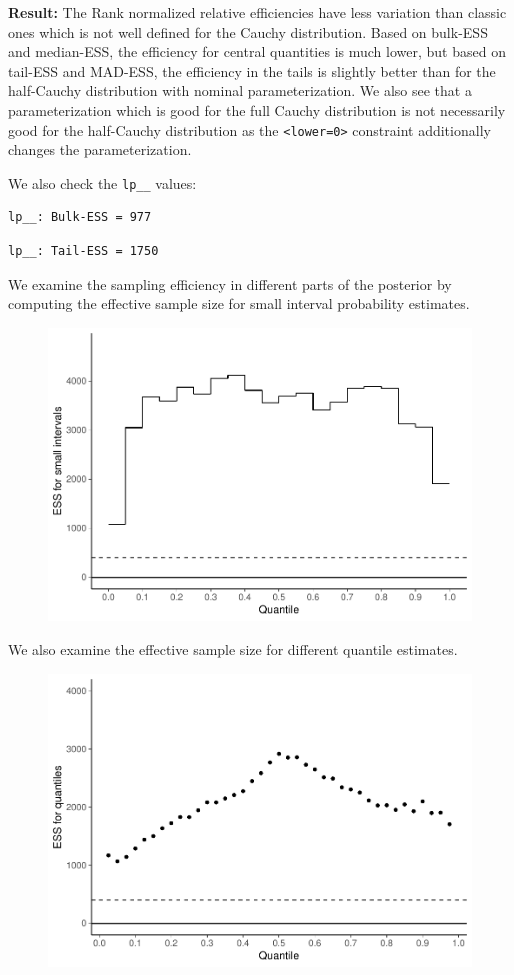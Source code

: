 \documentclass[american,]{article}
\begin{document}
\textbf{Result:} The Rank normalized relative efficiencies have less
variation than classic ones which is not well defined for the Cauchy
distribution. Based on bulk-ESS and median-ESS, the efficiency for
central quantities is much lower, but based on tail-ESS and MAD-ESS, the
efficiency in the tails is slightly better than for the half-Cauchy
distribution with nominal parameterization. We also see that a
parameterization which is good for the full Cauchy distribution is not
necessarily good for the half-Cauchy distribution as the
\texttt{\textless{}lower=0\textgreater{}} constraint additionally
changes the parameterization.

We also check the \texttt{lp\_\_} values:

\begin{verbatim}
lp__: Bulk-ESS = 977
\end{verbatim}

\begin{verbatim}
lp__: Tail-ESS = 1750
\end{verbatim}

We examine the sampling efficiency in different parts of the posterior
by computing the effective sample size for small interval probability
estimates.

\begin{figure}[t]
  \centering
  \includegraphics[width=0.6\linewidth]{graphics/local-ess-fit-half-reparam-1.pdf}
\end{figure}

We also examine the effective sample size for different quantile
estimates.

\begin{figure}[t]
  \centering
  \includegraphics[width=0.6\linewidth]{graphics/quantile-ess-fit-half-reparam-1.pdf}
\end{figure}
\end{document}
